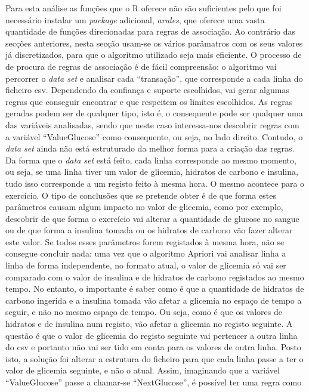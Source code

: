 Para esta análise as funções que o R oferece não são suficientes pelo que foi necessário instalar um \textit{package} adicional, \textit{arules}, que oferece uma vasta quantidade de funções direcionadas para regras de associação. Ao contrário das secções anteriores, nesta secção usam-se os vários parâmatros com os seus valores já discretizados, para que o algoritmo utilizado seja mais eficiente. O processo de de procura de regras de associação é de fácil compreensão: o algoritmo vai percorrer o \textit{data set} e analisar cada ``transação'', que corresponde a cada linha do ficheiro csv. Dependendo da confiança e suporte escolhidos, vai gerar algumas regras que conseguir encontrar e que respeitem os limites escolhidos. As regras geradas podem ser de qualquer tipo, isto é, o consequente pode ser qualquer uma das variáveis analisadas, sendo que neste caso interessa-nos descobrir regras com a variável ``Value\textunderscore Glucose'' como consequente, ou seja, no lado direito. Contudo, o \textit{data set} ainda não está estruturado da melhor forma para a criação das regras. 
Da forma que o \textit{data set} está feito, cada linha corresponde ao mesmo momento, ou seja, se uma linha tiver um valor de glicemia, hidratos de carbono e insulina, tudo isso corresponde a um registo feito à mesma hora. O mesmo acontece para o exercício. O tipo de conclusões que se pretende obter é de que forma estes parâmetros causam algum impacto no valor de glicemia, como por exemplo, descobrir de que forma o exercício vai alterar a quantidade de glucose no sangue ou de que forma a insulina tomada ou os hidratos de carbono vão fazer alterar este valor. Se todos esses parâmetros forem registados à mesma hora, não se consegue concluir nada: uma vez que o algoritmo Apriori vai analisar linha a linha de forma independente, no formato atual, o valor de glicemia só vai ser comparado com o valor de insulina e de hidratos de carbono registados ao mesmo tempo. No entanto, o importante é saber como é que a quantidade de hidratos de carbono ingerida e a insulina tomada vão afetar a glicemia no espaço de tempo a seguir, e não no mesmo espaço de tempo. Ou seja, como é que os valores de hidratos e de insulina num registo, vão afetar a glicemia no registo seguinte. A questão é que o valor de glicemia do registo seguinte vai pertencer a outra linha do csv e portanto não vai ser tido em conta para os valores de outra linha. Posto isto, a solução foi alterar a estrutura do ficheiro para que cada linha passe a ter o valor de glicemia seguinte, e não o atual. Assim, imaginando que a variável ``Value\textunderscore Glucose'' passe a chamar-se ``Next\textunderscore Glucose'', é possível ter uma regra como

